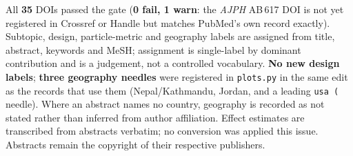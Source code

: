 \documentclass[10pt]{article}
\begin{document}
\begin{keybox}
{All \textbf{35} DOIs passed the gate (\textbf{0 fail, 1 warn}: the \textit{AJPH} AB\,617 DOI is
not yet registered in Crossref or Handle but matches PubMed's own record exactly).
Subtopic, design, particle-metric and geography labels are assigned from title, abstract,
keywords and MeSH; assignment is single-label by dominant contribution and is a judgement, not a
controlled vocabulary. \textbf{No new design labels}; \textbf{three geography needles} were
registered in \texttt{plots.py} in the same edit as the records that use them (Nepal/Kathmandu,
Jordan, and a leading \texttt{usa (} needle). Where an abstract names no country, geography is
recorded as not stated rather than inferred from author affiliation. Effect estimates are
transcribed from abstracts verbatim; no conversion was applied this issue. Abstracts remain the
copyright of their respective publishers.\par}
\end{keybox}
\end{document}

